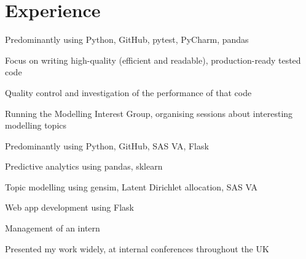 \documentclass[]{cv-template}
\begin{document}
\begin{minipage}[t]{0.66\textwidth} 


\section{Experience}
\vspace{\topsep} %
\begin{tightemize}
\item Predominantly using Python, GitHub, pytest, PyCharm, pandas
\item Focus on writing high-quality (efficient and readable), production-ready tested code
\item Quality control and investigation of the performance of that code
\item Running the Modelling Interest Group, organising sessions about interesting modelling topics
\end{tightemize}

\sectionsep

\begin{tightemize}
\item Predominantly using Python, GitHub, SAS VA, Flask
\item Predictive analytics using pandas, sklearn
\item Topic modelling using gensim, Latent Dirichlet allocation, SAS VA
\item Web app development using Flask
\item Management of an intern
\item Presented my work widely, at internal conferences throughout the UK
\end{tightemize}
\sectionsep



\end{minipage}
\end{document}

